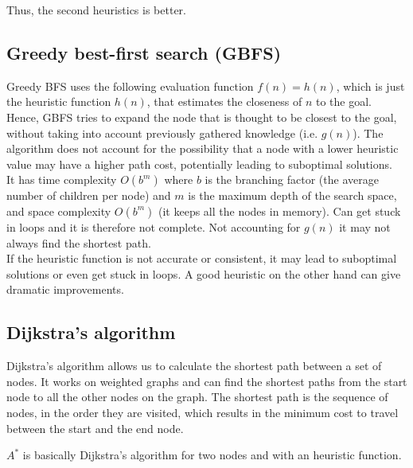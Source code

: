 \documentclass{article}
\begin{document}
\begin{flushleft}
    Thus, the second heuristics is better.
\end{flushleft}

\newpage

\subsection{Greedy best-first search (GBFS)}

Greedy BFS uses the following evaluation function $f(n) = h(n)$, which is just the heuristic function $h(n)$, that estimates the closeness of $n$ to the goal. Hence, GBFS tries to expand the node that is thought to be closest to the goal, without taking into account previously gathered knowledge (i.e. $g(n)$). The algorithm does not account for the possibility that a node with a lower heuristic value may have a higher path cost, potentially leading to suboptimal solutions.\\

It has time complexity $O(b^m)$ where $b$ is the branching factor (the average number of children per node) and $m$ is the maximum depth of the search space, and space complexity $O(b^m)$ (it keeps all the nodes in memory). Can get stuck in loops and it is therefore not complete. Not accounting for $g(n)$ it may not always find the shortest path. \\

If the heuristic function is not accurate or consistent, it may lead to suboptimal solutions or even get stuck in loops. A good heuristic on the other hand can give dramatic improvements. 

\newpage

\subsection{Dijkstra's algorithm}

Dijkstra's algorithm allows us to calculate the shortest path between a set of nodes. It works on weighted graphs and can find the shortest paths from the start node to all the other nodes on the graph. The shortest path is the sequence of nodes, in the order they are visited, which results in the minimum cost to travel between the start and the end node. \\

\begin{flushleft}
    $A^*$ is basically Dijkstra's algorithm for two nodes and with an heuristic function.
\end{flushleft}
\end{document}
